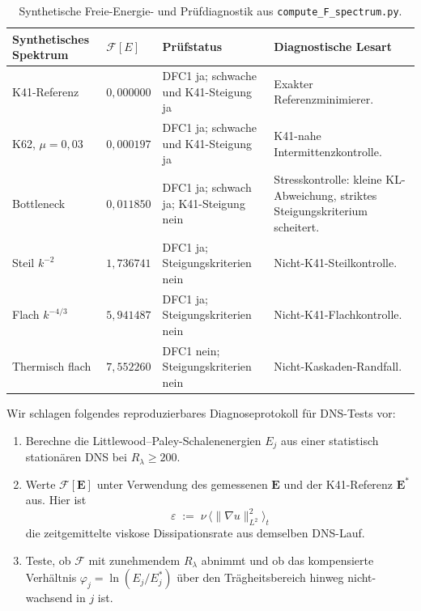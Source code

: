 \documentclass[12pt,a4paper]{article}
\theoremstyle{definition}
\theoremstyle{plain}
\theoremstyle{remark}
\begin{document}
\begin{table}[htbp]
\centering
\small
\setlength{\tabcolsep}{4.5pt}
\renewcommand{\arraystretch}{1.18}
\begin{tabular}{L{0.22\textwidth}C{0.13\textwidth}L{0.27\textwidth}L{0.30\textwidth}}
\toprule
\textbf{Synthetisches Spektrum} & \textbf{$\mathcal{F}[E]$} & \textbf{Prüfstatus} & \textbf{Diagnostische Lesart} \\
\midrule
K41-Referenz & $0{,}000000$ & DFC1 ja; schwache und K41-Steigung ja & Exakter Referenzminimierer. \\
\addlinespace[2pt]
K62, $\mu=0{,}03$ & $0{,}000197$ & DFC1 ja; schwache und K41-Steigung ja & K41-nahe Intermittenzkontrolle. \\
\addlinespace[2pt]
Bottleneck & $0{,}011850$ & DFC1 ja; schwach ja; K41-Steigung nein & Stresskontrolle: kleine KL-Abweichung, striktes Steigungskriterium scheitert. \\
\addlinespace[2pt]
Steil $k^{-2}$ & $1{,}736741$ & DFC1 ja; Steigungskriterien nein & Nicht-K41-Steilkontrolle. \\
\addlinespace[2pt]
Flach $k^{-4/3}$ & $5{,}941487$ & DFC1 ja; Steigungskriterien nein & Nicht-K41-Flachkontrolle. \\
\addlinespace[2pt]
Thermisch flach & $7{,}552260$ & DFC1 nein; Steigungskriterien nein & Nicht-Kaskaden-Randfall. \\
\bottomrule
\end{tabular}
\caption{Synthetische Freie-Energie- und Prüfdiagnostik aus \texttt{compute\_F\_spectrum.py}.}
\label{tab:numerical-diagnostics}
\end{table}

Wir schlagen folgendes reproduzierbares Diagnoseprotokoll für DNS-Tests vor:
\begin{enumerate}
\item Berechne die Littlewood--Paley-Schalenenergien $E_j$ aus
  einer statistisch stationären DNS bei $R_\lambda \ge 200$.
\item Werte $\mathcal{F}[\mathbf{E}]$ unter Verwendung des gemessenen
  $\mathbf{E}$ und der K41-Referenz $\mathbf{E}^*$ aus. Hier ist
  \[
    \varepsilon
    \;:=\;
    \nu\,\bigl\langle\|\nabla u\|_{L^2}^2\bigr\rangle_t
  \]
  die zeitgemittelte viskose Dissipationsrate aus demselben DNS-Lauf.
\item Teste, ob $\mathcal{F}$ mit zunehmendem $R_\lambda$ abnimmt
  und ob das kompensierte Verhältnis $\varphi_j = \ln(E_j/E_j^*)$ über den
  Trägheitsbereich hinweg nicht-wachsend in $j$ ist.
\end{enumerate}
\end{document}
